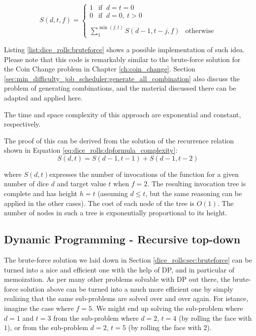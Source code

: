 \begin{equation}
	S(d,t,f)=\begin{cases}
		 1 \: \: \text{ if } \: d=t=0 \\
		 0 \: \: \text{ if } \: d=0, \: t>0 \\ \\
		\sum_{1}^{\min(f,t)} S(d-1,t-j,f)  \:\: \text{ otherwise}
	 \end{cases}
	\label{eq:dice_rolls:dpformula}
\end{equation}

Listing \ref{list:dice_rolls:bruteforce} shows a possible implementation of such idea. Please note
that this code is remarkably similar to the brute-force solution for the Coin Change problem in
Chapter \ref{ch:coin_change}. Section
\ref{sec:min_difficulty_job_scheduler:generate_all_combination} also discuss the problem of
generating combinations, and the material discussed there can be adapted and applied here.




The time and space complexity of this approach are exponential and constant, respectively.
 
The proof of this  can be derived from the solution of the recurrence relation shown in Equation \ref{eq:dice_rolls:dpformula_complexity}:
\begin{equation}
	S(d,t) = S(d-1,t-1) + S(d-1,t-2)
\label{eq:dice_rolls:dpformula_complexity}
\end{equation}

where $S(d,t)$expresses the number of invocations of the function 
for a given number of dice $d$ and target value $t$ when $f=2$. 
The resulting invocation tree is
complete and has height $h=t$ (assuming $d \leq t$, but the same reasoning can be applied in the
other cases). 
The cost of each node of the tree is $O(1)$. The number of nodes in such a tree is
exponentially proportional to its height. 



\subsection{Dynamic Programming - Recursive top-down}
\label{dice_rolls:sec:DP}
The brute-force solution we laid down in Section \ref{dice_rolls:sec:bruteforce} can  be turned into a nice and
efficient one with the help of DP, and in particular of memoization. As per many other problems
solvable with DP out there, the brute-force solution above can be turned into a much more
efficient one by simply realizing that the same sub-problems are solved over and over again.
For istance, imagine the case where $f=5$. We might end up solving the sub-problem where $d=1$ and
$t=3$  from the sub-problem where $d=2$, $t=4$ (by rolling the face with $1$), or from the
sub-problem $d=2$, $t=5$ (by rolling the face with $2$).

